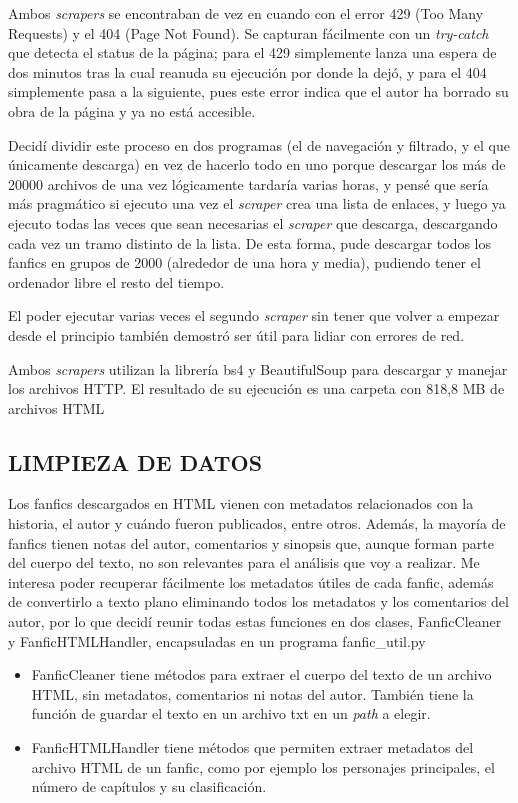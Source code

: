 \documentclass{pre-tfg}
\begin{document}
Ambos \textit{scrapers} se encontraban de vez en cuando con el error 429 (Too Many Requests) y el 404 (Page Not Found). Se capturan fácilmente con un \textit{try-catch} que detecta el status de la página; para el 429 simplemente lanza una espera de dos minutos tras la cual reanuda su ejecución por donde la dejó, y para el 404 simplemente pasa a la siguiente, pues este error indica que el autor ha borrado su obra de la página y ya no está accesible.
 
Decidí dividir este proceso en dos programas (el de navegación y filtrado, y el que únicamente descarga) en vez de hacerlo todo en uno porque descargar los más de 20000 archivos de una vez lógicamente tardaría varias horas, y pensé que sería más pragmático si ejecuto una vez el \textit{scraper} crea una lista de enlaces, y luego ya ejecuto todas las veces que sean necesarias el \textit{scraper} que descarga, descargando cada vez un tramo distinto de la lista. De esta forma, pude descargar todos los fanfics en grupos de 2000 (alrededor de una hora y media), pudiendo tener el ordenador libre el resto del tiempo.

El poder ejecutar varias veces el segundo \textit{scraper} sin tener que volver a empezar desde el principio también demostró ser útil para lidiar con errores de red.

Ambos \textit{scrapers} utilizan la librería bs4 y BeautifulSoup para descargar y manejar los archivos HTTP. El resultado de su ejecución es una carpeta con 818,8 MB de archivos HTML

\subsection{LIMPIEZA DE DATOS}
\label{sec:limpiezadatos}
Los fanfics descargados en HTML vienen con metadatos relacionados con la historia, el autor y cuándo fueron publicados, entre otros. Además, la mayoría de fanfics tienen notas del autor, comentarios y sinopsis que, aunque forman parte del cuerpo del texto, no son relevantes para el análisis que voy a realizar.
Me interesa poder recuperar fácilmente los metadatos útiles de cada fanfic, además de convertirlo a texto plano eliminando todos los metadatos y los comentarios del autor, por lo que decidí reunir todas estas funciones en dos clases, FanficCleaner y FanficHTMLHandler, encapsuladas en un programa fanfic\_util.py

\begin{itemize}
	\item FanficCleaner tiene métodos para extraer el cuerpo del texto de un archivo HTML, sin metadatos, comentarios ni notas del autor. También tiene la función de guardar el texto en un archivo txt en un \textit{path} a elegir.
	\item FanficHTMLHandler tiene métodos que permiten extraer metadatos del archivo HTML de un fanfic, como por ejemplo los personajes principales, el número de capítulos y su clasificación.
\end{itemize}
\end{document}
